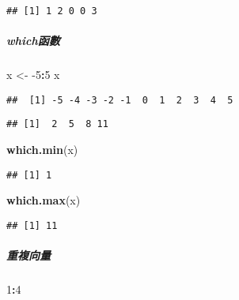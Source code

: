 \documentclass[
]{article}
\newenvironment{Shaded}{\begin{snugshade}}{\end{snugshade}}
\newcommand{\DecValTok}[1]{\textcolor[rgb]{0.00,0.00,0.81}{#1}}
\newcommand{\KeywordTok}[1]{\textcolor[rgb]{0.13,0.29,0.53}{\textbf{#1}}}
\newcommand{\NormalTok}[1]{#1}
\newcommand{\OperatorTok}[1]{\textcolor[rgb]{0.81,0.36,0.00}{\textbf{#1}}}
\newcommand{\StringTok}[1]{\textcolor[rgb]{0.31,0.60,0.02}{#1}}
\begin{document}
\begin{verbatim}
## [1] 1 2 0 0 3
\end{verbatim}

\hypertarget{whichux51fdux6578}{%
\subparagraph{\texorpdfstring{
which函數}{ which函數}}\label{whichux51fdux6578}}

\begin{Shaded}
\begin{Highlighting}[]
\NormalTok{x <-}\StringTok{ }\DecValTok{-5}\OperatorTok{:}\DecValTok{5}
\NormalTok{x}
\end{Highlighting}
\end{Shaded}

\begin{verbatim}
##  [1] -5 -4 -3 -2 -1  0  1  2  3  4  5
\end{verbatim}

\begin{Shaded}
\end{Shaded}

\begin{verbatim}
## [1]  2  5  8 11
\end{verbatim}

\begin{Shaded}
\begin{Highlighting}[]
\KeywordTok{which.min}\NormalTok{(x)}
\end{Highlighting}
\end{Shaded}

\begin{verbatim}
## [1] 1
\end{verbatim}

\begin{Shaded}
\begin{Highlighting}[]
\KeywordTok{which.max}\NormalTok{(x)}
\end{Highlighting}
\end{Shaded}

\begin{verbatim}
## [1] 11
\end{verbatim}

\hypertarget{ux91cdux8907ux5411ux91cf}{%
\subparagraph{重複向量}\label{ux91cdux8907ux5411ux91cf}}

\begin{Shaded}
\begin{Highlighting}[]
\DecValTok{1}\OperatorTok{:}\DecValTok{4}
\end{Highlighting}
\end{Shaded}
\end{document}
